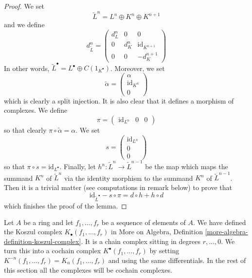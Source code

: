 \documentclass{amsart}
\theoremstyle{plain}
\theoremstyle{definition}
\theoremstyle{remark}
\numberwithin{equation}{subsection}
\begin{document}
\begin{proof}
We set
$$
\tilde L^n = L^n \oplus K^n \oplus K^{n + 1}
$$
and we define
$$
d^n_{\tilde L} =
\left(
\begin{matrix}
d^n_L & 0 & 0 \\
0 & d^n_K & \text{id}_{K^{n + 1}} \\
0 & 0 & -d^{n + 1}_K
\end{matrix}
\right)
$$
In other words, $\tilde L^\bullet = L^\bullet \oplus C(1_{K^\bullet})$.
Moreover, we set
$$
\tilde \alpha =
\left(
\begin{matrix}
\alpha \\
\text{id}_{K^n} \\
0
\end{matrix}
\right)
$$
which is clearly a split injection. It is also clear that it defines a morphism
of complexes. We define
$$
\pi =
\left(
\begin{matrix}
\text{id}_{L^n} &
0 &
0
\end{matrix}
\right)
$$
so that clearly $\pi \circ \tilde \alpha = \alpha$. We set
$$
s =
\left(
\begin{matrix}
\text{id}_{L^n} \\
0 \\
0
\end{matrix}
\right)
$$
so that $\pi \circ s = \text{id}_{L^\bullet}$. Finally,
let $h^n : \tilde L^n \to \tilde L^{n - 1}$ be the map
which maps the summand $K^n$ of $\tilde L^n$ via the identity morphism
to the summand $K^n$ of $\tilde L^{n - 1}$. Then it is a trivial matter
(see computations in remark below) to prove that
$$
\text{id}_{\tilde L^\bullet} - s \circ \pi
=
d \circ h + h \circ d
$$
which finishes the proof of the lemma.
\end{proof}


\noindent
Let $A$ be a ring and let $f_1, \ldots, f_r$ be a sequence of elements
of $A$. We have defined the Koszul complex
$K_\bullet(f_1, \ldots, f_r)$ in
More on Algebra, Definition \ref{more-algebra-definition-koszul-complex}.
It is a chain complex sitting in degrees $r, \ldots, 0$.
We turn this into a cochain complex $K^\bullet(f_1, \ldots, f_r)$
by setting $K^{-n}(f_1, \ldots, f_r) = K_n(f_1, \ldots, f_r)$
and using the same differentials. In the rest of this section all
the complexes will be cochain complexes.
\end{document}
